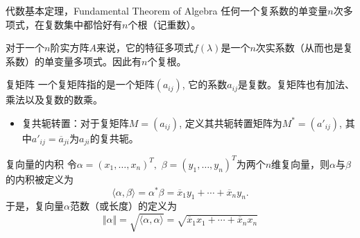 \begin{frame}

\begin{block}{代数基本定理，Fundamental Theorem of Algebra}
任何一个复系数的单变量$n$次多项式，在复数集中都恰好有$n$个根（记重数）。
\end{block}

\vspace{2em}
\pause

对于一个$n$阶实方阵$A$来说，它的特征多项式$f(\lambda)$是一个$n$次实系数（从而也是复系数）的单变量多项式。因此有$n$个复根。

\end{frame}


\begin{frame}

\begin{block}{复矩阵}
一个复矩阵指的是一个矩阵$(a_{ij})$, 它的系数$a_{ij}$是复数。复矩阵也有加法、乘法以及复数的数乘。

\pause

\begin{itemize}
\item 复共轭转置：对于复矩阵$M = (a_{ij})$, 定义其共轭转置矩阵为$M^* = (a'_{ij})$, 其中$a'_{ij} = \overline{a}_{ji}$为$a_{ji}$的复共轭。
\end{itemize}
\end{block}

\vspace{1em}
\pause

\begin{block}{复向量的内积}
令$\alpha = (x_1,\ldots,x_n)^T,$ $\beta = (y_1,\ldots,y_n)^T$为两个$n$维复向量，则$\alpha$与$\beta$的内积被定义为
\[\langle \alpha, \beta \rangle = \alpha^*\beta = \overline{x}_1y_1 + \cdots + \overline{x}_ny_n.\]
于是，复向量$\alpha$范数（或长度）的定义为
\[\Vert \alpha \Vert = \sqrt{\langle \alpha, \alpha \rangle} = \sqrt{\overline{x}_1x_1 + \cdots + \overline{x}_nx_n}\]
\end{block}

\end{frame}


